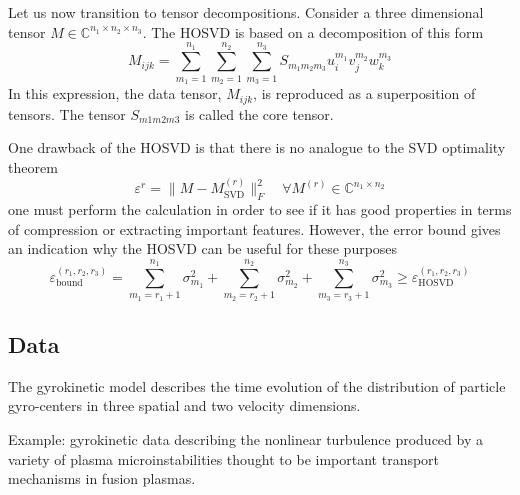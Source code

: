\documentclass[../../main.tex]{subfiles}
\begin{document}

Let us now transition to tensor decompositions. Consider a three dimensional tensor $M \in \mathbb{C}^{n_1\times n_2\times n_3}$. The HOSVD is based on a decomposition of this form
    \[  M_{ijk} = \sum_{m_1 = 1}^{n_1}\sum_{m_2 = 1}^{n_2}\sum_{m_3 = 1}^{n_3} S_{m_1m_2m_3}u_i^{m_1}v_j^{m_2}w_k^{m_3}\]
In this expression, the data tensor, $M_{ijk}$, is reproduced as a superposition of tensors. The tensor $S_{m1m2m3}$ is called the core tensor.


One drawback of the HOSVD is that there is no analogue to the SVD optimality theorem
    \[ \varepsilon^{r} = \| M - M_{\text{SVD}}^{(r)} \|_F^2 \quad \forall M^{(r)}\in \mathbb{C}^{n_1\times n_2} \]
one must perform the calculation in order to see if it has good properties in terms of compression or extracting important features.
However, the error bound gives an indication why the HOSVD can be useful for these purposes
    \[ \varepsilon_{\text{bound}}^{(r_1, r_2, r_3)} = \sum_{m_1 = r_1 + 1}^{n_1}\sigma_{m_1}^2 + \sum_{m_2 = r_2 + 1}^{n_2}\sigma_{m_2}^2 + \sum_{m_3 = r_3 + 1}^{n_3}\sigma_{m_3}^2 \geq \varepsilon_{\text{HOSVD}}^{(r_1, r_2, r_3)}  \]





\subsection{Data}

The gyrokinetic model describes the time evolution of the distribution of particle gyro-centers in three spatial and two velocity dimensions.


Example: gyrokinetic data describing the nonlinear turbulence produced by a variety of plasma microinstabilities thought to be important transport mechanisms in fusion plasmas.
\end{document}
